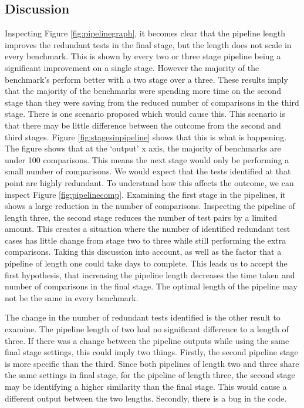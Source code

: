 \subsection{Discussion}

Inspecting Figure \ref{fig:pipelinegraph}, it becomes clear that the pipeline length improves the redundant tests in the final stage, but the length does not scale in every benchmark. This is shown by every two or three stage pipeline being a significant improvement on a single stage. However the majority of the benchmark's perform better with a two stage over a three. These results imply that the majority of the benchmarks were spending more time on the second stage than they were saving from the reduced number of comparisons in the third stage. There is one scenario proposed which would cause this. This scenario is that there may be little difference between the outcome from the second and third stages. Figure \ref{fig:stagesinpipeline} shows that this is what is happening. The figure shows that at the `output' x axis, the majority of benchmarks are under 100 comparisons. This means the next stage would only be performing a small number of comparisons. We would expect that the tests identified at that point are highly redundant. To understand how this affects the outcome, we can inspect Figure \ref{fig:pipelinecomp}. Examining the first stage in the pipelines, it shows a large reduction in the number of comparisons. Inspecting the pipeline of length three, the second stage reduces the number of test pairs by a limited amount. This creates a situation where the number of identified redundant test cases has little change from stage two to three while still performing the extra comparisons. Taking this discussion into account, as well as the factor that a pipeline of length one could take days to complete. This leads us to accept the first hypothesis, that increasing the pipeline length decreases the time taken and number of comparisons in the final stage. The optimal length of the pipeline may not be the same in every benchmark.

The change in the number of redundant tests identified is the other result to examine. The pipeline length of two had no significant difference to a length of three. If there was a change between the pipeline outputs while using the same final stage settings, this could imply two things. Firstly, the second pipeline stage is more specific than the third. Since both pipelines of length two and three share the same settings in final stage, for the pipeline of length three, the second stage may be identifying a higher similarity than the final stage. This would cause a different output between the two lengths. Secondly, there is a bug in the code.

